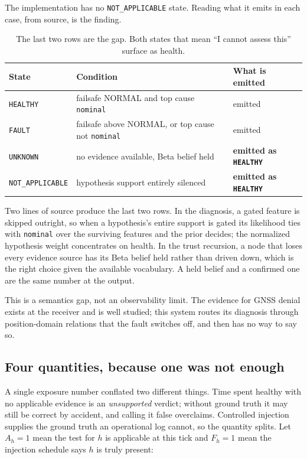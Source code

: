 \documentclass[11pt,a4paper]{article}
\newcommand{\code}[1]{\texttt{\small #1}}
\begin{document}
The implementation has no \code{NOT\_APPLICABLE} state. Reading what it emits
in each case, from source, is the finding.

\begin{table}[h]
\centering
\small
\begin{tabular}{p{}p{}p{}}
\toprule
State & Condition & What is emitted \\
\midrule
\code{HEALTHY} & failsafe NORMAL and top cause \code{nominal} & emitted \\
\code{FAULT} & failsafe above NORMAL, or top cause not \code{nominal} &
emitted \\
\code{UNKNOWN} & no evidence available, Beta belief held &
\textbf{emitted as \code{HEALTHY}} \\
\code{NOT\_APPLICABLE} & hypothesis support entirely silenced &
\textbf{emitted as \code{HEALTHY}} \\
\bottomrule
\end{tabular}
\caption{The last two rows are the gap. Both states that mean ``I cannot
assess this'' surface as health.}
\label{tab:fourstate}
\end{table}

Two lines of source produce the last two rows. In the diagnosis, a gated
feature is skipped outright, so when a hypothesis's entire support is gated its
likelihood ties with \code{nominal} over the surviving features and the prior
decides; the normalized hypothesis weight concentrates on health. In the trust recursion, a node
that loses every evidence source has its Beta belief held rather than driven
down, which is the right choice given the available vocabulary. A held belief
and a confirmed one are the same number at the output.

This is a semantics gap, not an observability limit. The evidence for GNSS
denial exists at the receiver and is well studied; this system routes its
diagnosis through position-domain relations that the fault switches off, and
then has no way to say so.

\subsection{Four quantities, because one was not enough}
\label{sec:fourq}

A single exposure number conflated two different things. Time spent healthy
with no applicable evidence is an \emph{unsupported} verdict; without ground
truth it may still be correct by accident, and calling it false overclaims.
Controlled injection supplies the ground truth an operational log cannot, so
the quantity splits. Let $A_h = 1$ mean the test for $h$ is applicable at this
tick and $F_h = 1$ mean the injection schedule says $h$ is truly present:
\end{document}
